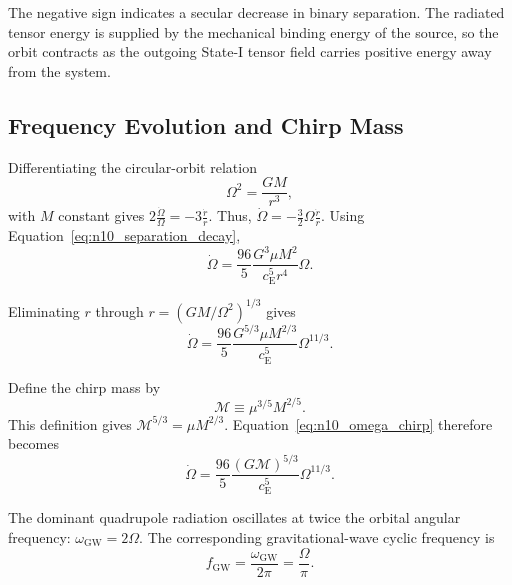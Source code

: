 The negative sign indicates a secular decrease in binary separation. The radiated tensor energy is supplied by the mechanical binding energy of the source, so the orbit contracts as the outgoing State-I tensor field carries positive energy away from the system.

\subsection{Frequency Evolution and Chirp Mass}
\label{subsec:n10_chirp_relation}

Differentiating the circular-orbit relation
\begin{equation}
    \Omega^{2} = \frac{GM}{r^{3}},
\end{equation}
with $M$ constant gives $2\frac{\dot{\Omega}}{\Omega} = - 3\frac{\dot{r}}{r}$. Thus, $\dot{\Omega} = - \frac{3}{2} \Omega \frac{\dot{r}}{r}$. Using Equation~\eqref{eq:n10_separation_decay},
\begin{equation}
    \dot{\Omega} = \frac{96}{5} \frac{ G^{3}\mu M^{2} }{ c_{\mathrm{E}}^{5}r^{4} } \Omega.
    \label{eq:n10_omega_dot_r}
\end{equation}

Eliminating $r$ through $r = \left( GM/\Omega^{2} \right)^{1/3}$ gives
\begin{equation}
    \dot{\Omega} = \frac{96}{5} \frac{ G^{5/3}\mu M^{2/3} }{ c_{\mathrm{E}}^{5} } \Omega^{11/3}.
    \label{eq:n10_omega_chirp}
\end{equation}

Define the chirp mass by
\begin{equation}
    \mathcal{M} \equiv \mu^{3/5}M^{2/5}.
    \label{eq:n10_chirp_mass}
\end{equation}
This definition gives $\mathcal{M}^{5/3} = \mu M^{2/3}$. Equation~\eqref{eq:n10_omega_chirp} therefore becomes
\begin{equation}
    \dot{\Omega} = \frac{96}{5} \frac{ \left( G\mathcal{M} \right)^{5/3} }{ c_{\mathrm{E}}^{5} } \Omega^{11/3}.
    \label{eq:n10_omega_chirp_mass}
\end{equation}

The dominant quadrupole radiation oscillates at twice the orbital angular frequency: $\omega_{\mathrm{GW}} = 2\Omega$. The corresponding gravitational-wave cyclic frequency is
\begin{equation}
    f_{\mathrm{GW}} = \frac{ \omega_{\mathrm{GW}} }{ 2\pi } = \frac{\Omega}{\pi}.
    \label{eq:n10_gw_frequency}
\end{equation}

